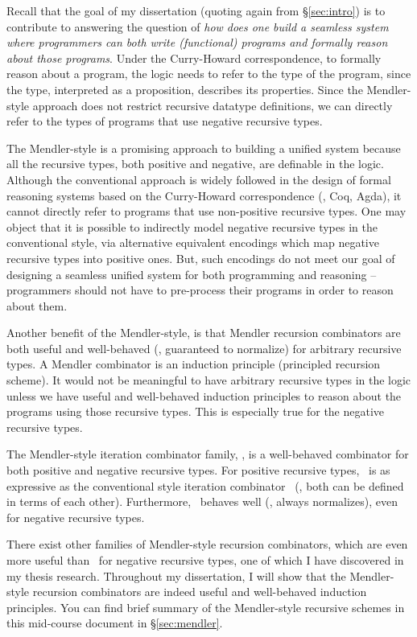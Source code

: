 Recall that the goal of my dissertation (quoting again from \S\ref{sec:intro})
is to contribute to answering the question of {\em how does one build a
seamless system where programmers can both write (functional) programs and
formally reason about those programs}. Under the Curry-Howard correspondence,
to formally reason about a program, the logic needs to refer to the type of
the program, since the type, interpreted as a proposition, describes its
properties. Since the Mendler-style approach does not restrict recursive
datatype definitions, we can directly refer to the types of programs that use
negative recursive types.

The Mendler-style is a promising approach to building a unified system because
all the recursive types, both positive and negative, are definable in the
logic. Although the conventional approach is widely followed in the design of
formal reasoning systems based on the Curry-Howard correspondence (\eg, Coq,
Agda), it cannot directly refer to programs that use non-positive recursive
types. One may object that it is possible to indirectly model negative
recursive types in the conventional style, via alternative equivalent
encodings which map negative recursive types into positive ones. But, such
encodings do not meet our goal of designing a seamless unified system for both
programming and reasoning -- programmers should not have to pre-process their
programs in order to reason about them.

Another benefit of the Mendler-style, is that Mendler recursion combinators
are both useful and well-behaved (\ie, guaranteed to normalize) for arbitrary
recursive types. A Mendler combinator is an induction principle
(principled recursion scheme). It would not be meaningful to have
arbitrary recursive types in the logic unless we have useful and well-behaved
induction principles to reason about the programs using those recursive types.
This is especially true for the negative recursive types.

The Mendler-style iteration combinator family, \MIt, is a well-behaved
combinator for both positive and negative recursive types.
For positive recursive types, \MIt\ is as expressive as the conventional style
iteration combinator \It\ (\ie, both can be defined in terms of each other). 
Furthermore, \MIt\ behaves well (\ie, always normalizes), even for negative
recursive types.

There exist other families of Mendler-style recursion combinators,
which are even more useful than \MIt\ for negative recursive types,
one of which I have discovered in my thesis research. Throughout
my dissertation, I will show that the Mendler-style recursion combinators are
indeed useful and well-behaved induction principles. You can find brief
summary of the Mendler-style recursive schemes in this mid-course document
in \S\ref{sec:mendler}.



